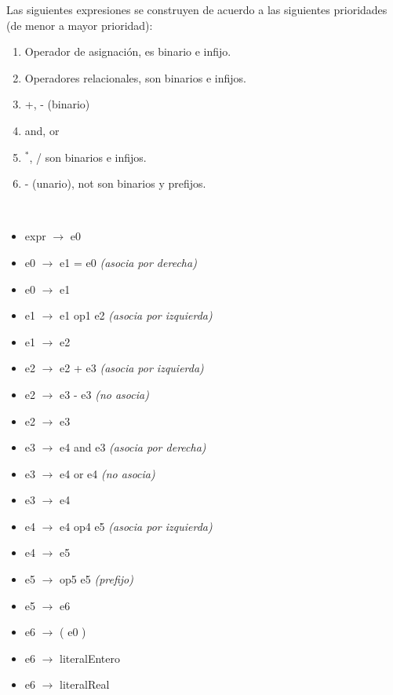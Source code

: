 \documentclass[11pt]{article}
\begin{document}
            Las siguientes expresiones se construyen de acuerdo a las siguientes prioridades (de menor a mayor prioridad):
            \begin{enumerate}
                \item Operador de asignación, es binario e infijo. 
                \item Operadores relacionales, son binarios e infijos.
                \item +, - (binario)
                \item and, or
                \item $^{\ast}$, / son binarios e infijos.
                \item - (unario), not son binarios y prefijos.
            \end{enumerate}
            \
            \begin{itemize}
                \item expr $\rightarrow$ e0
                \item e0 $\rightarrow$ e1 = e0 \textit{(asocia por derecha)}
                \item e0 $\rightarrow$ e1
                \item e1 $\rightarrow$ e1 op1 e2 \textit{(asocia por izquierda)}
                \item e1 $\rightarrow$ e2
                \item e2 $\rightarrow$ e2 + e3 \textit{(asocia por izquierda)}
                \item e2 $\rightarrow$ e3 - e3 \textit{(no asocia)}
                \item e2 $\rightarrow$ e3
                \item e3 $\rightarrow$ e4 and e3 \textit{(asocia por derecha)}
                \item e3 $\rightarrow$ e4 or e4 \textit{(no asocia)}
                \item e3 $\rightarrow$ e4
                \item e4 $\rightarrow$ e4 op4 e5 \textit{(asocia por izquierda)}
                \item e4 $\rightarrow$ e5
                \item e5 $\rightarrow$ op5 e5 \textit{(prefijo)}
                \item e5 $\rightarrow$ e6
                \item e6 $\rightarrow$ ( e0 )
                \item e6 $\rightarrow$ literalEntero
                \item e6 $\rightarrow$ literalReal

\end{itemize}
\end{document}

